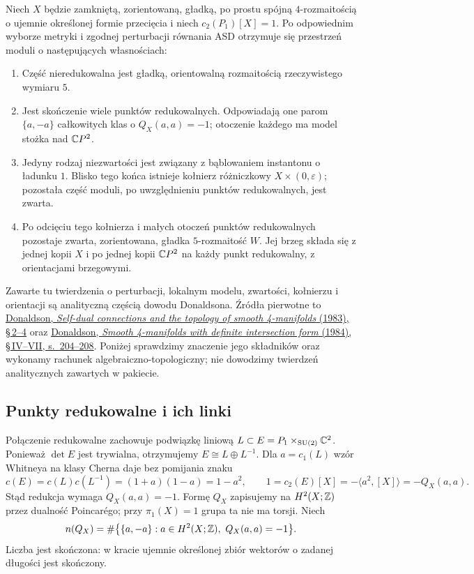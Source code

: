 \begin{twierdzenie}[Pakiet moduli dla $k=1$;
wyniki zewnętrzne]
\label{thm:donaldson-moduli-packet}
Niech $X$ będzie zamkniętą, zorientowaną, gładką,
po prostu spójną $4$-rozmaitością o ujemnie
określonej formie przecięcia i niech $c_2(P_1)[X]=1$.
Po odpowiednim wyborze metryki i zgodnej perturbacji
równania ASD otrzymuje się przestrzeń moduli o
następujących własnościach:
\begin{enumerate}
\item Część nieredukowalna jest gładką, orientowalną
  rozmaitością rzeczywistego wymiaru $5$.
\item Jest skończenie wiele punktów redukowalnych.
  Odpowiadają one parom $\{a,-a\}$ całkowitych klas
  o $Q_X(a,a)=-1$; otoczenie każdego ma model stożka
  nad $\mathbb{C} P^2$.
\item Jedyny rodzaj niezwartości jest związany z
  bąblowaniem instantonu o ładunku $1$. Blisko tego
  końca istnieje kołnierz różniczkowy
  $X\times(0,\varepsilon)$; pozostała część moduli,
  po uwzględnieniu punktów redukowalnych, jest zwarta.
\item Po odcięciu tego kołnierza i małych otoczeń
  punktów redukowalnych pozostaje zwarta, zorientowana,
  gładka $5$-rozmaitość $W$. Jej brzeg składa się z
  jednej kopii $X$ i po jednej kopii $\mathbb{C} P^2$ na
  każdy punkt redukowalny, z orientacjami brzegowymi.
\end{enumerate}
\end{twierdzenie}

Zawarte tu twierdzenia o perturbacji, lokalnym modelu,
zwartości, kołnierzu i orientacji są analityczną częścią
dowodu Donaldsona. Źródła pierwotne to
\href{https://doi.org/10.1090/S0273-0979-1983-15090-5}
{Donaldson, \emph{Self-dual connections and the topology
of smooth 4-manifolds} (1983), \S\,2--4} oraz
\href{https://math.berkeley.edu/~kirby/papers/Gordon%20and%20Kirby%20%28editors%29%20-%20Four-manifold%20theory%20%28Durham%29%20-%20MR0780574.pdf}
{Donaldson, \emph{Smooth 4-manifolds with definite
intersection form} (1984), \S\,IV--VII, s.~204--208}.
Poniżej sprawdzimy znaczenie jego składników oraz
wykonamy rachunek algebraiczno-topologiczny; nie
dowodzimy twierdzeń analitycznych zawartych w pakiecie.

\subsection*{Punkty redukowalne i ich linki}

Połączenie redukowalne zachowuje podwiązkę liniową
$L\subset E=P_1\times_{\mathrm{SU}(2)}\mathbb{C}^2$.
Ponieważ $\det E$ jest trywialna, otrzymujemy
$E\cong L\oplus L^{-1}$. Dla $a=c_1(L)$ wzór
Whitneya na klasy Cherna daje bez pomijania znaku
\[
 c(E)=c(L)c(L^{-1})=(1+a)(1-a)=1-a^2,
 \qquad
 1=c_2(E)[X]=-\langle a^2,[X]\rangle=-Q_X(a,a).
\]
Stąd redukcja wymaga $Q_X(a,a)=-1$.
Formę $Q_X$ zapisujemy na $H^2(X;\mathbb{Z})$ przez
dualność Poincarégo; przy $\pi_1(X)=1$ grupa ta
nie ma torsji. Niech
\[
 n(Q_X)=\#\bigl\{\{a,-a\}:a\in H^2(X;\mathbb{Z}),
                              \ Q_X(a,a)=-1\bigr\}.
\]
Liczba jest skończona: w kracie ujemnie określonej
zbiór wektorów o zadanej długości jest skończony.

